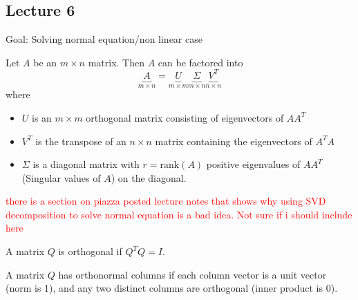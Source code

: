 \subsection{Lecture 6}
Goal: Solving normal equation/non linear case
\begin{definition}
  Let $A$ be an $m \times n$ matrix. Then $A$ can be factored into
  $$\underbrace{A}_{m \times n} = \underbrace{U}_{m \times m}\underbrace{\Sigma}_{m \times n}\underbrace{V^T}_{n \times n}$$
  where
  \begin{itemize}
    \item $U$ is an $m \times m$ orthogonal matrix consisting of eigenvectors of $AA^T$
    \item $V^T$ is the transpose of an $n \times n$ matrix containing the eigenvectors of $A^TA$
    \item $\Sigma$ is a diagonal matrix with $r = \text{rank}(A)$ positive eigenvalues of $AA^T$ (Singular values of $A$) on the diagonal.
  \end{itemize}
\end{definition}
\textcolor{red}{there is a section on piazza posted lecture notes that shows why using SVD decomposition to solve normal equation is a bad idea. Not sure if i should include here}
\begin{definition}
  A matrix $Q$ is orthogonal if $Q^TQ = I$.
\end{definition}
\begin{definition}
  A matrix $Q$ has orthonormal columns if each column vector is a unit vector (norm is 1), and any two distinct columns are orthogonal (inner product is 0).
\end{definition}


